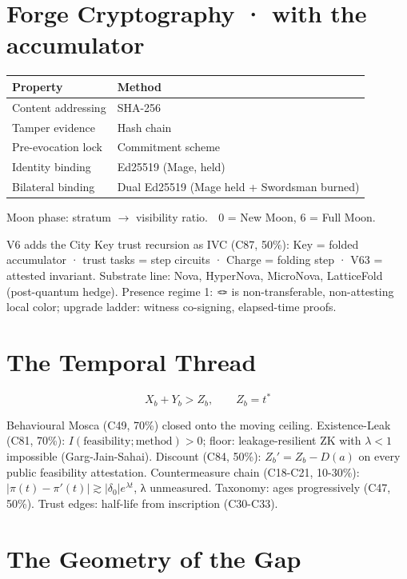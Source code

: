 \documentclass[
]{article}
\newcounter{none} %
\begin{document}
\section{Forge Cryptography · with the
accumulator}\label{forge-cryptography-with-the-accumulator}

{\def\LTcaptype{none} %
\begin{longtable}[]{@{}ll@{}}
\toprule\noalign{}
Property & Method \\
\midrule\noalign{}
\endhead
\bottomrule\noalign{}
\endlastfoot
Content addressing & SHA-256 \\
Tamper evidence & Hash chain \\
Pre-evocation lock & Commitment scheme \\
Identity binding & Ed25519 (Mage, held) \\
Bilateral binding & Dual Ed25519 (Mage held + Swordsman burned) \\
\end{longtable}
}

Moon phase: stratum \(\to\) visibility ratio. \(\;\) 0 = New Moon, 6 =
Full Moon.

V6 adds the City Key trust recursion as IVC (C87, 50\%): Key = folded
accumulator · trust tasks = step circuits · Charge = folding step · V63
= attested invariant. Substrate line: Nova, HyperNova, MicroNova,
LatticeFold (post-quantum hedge). Presence regime 1: 🪢 is
non-transferable, non-attesting local color; upgrade ladder: witness
co-signing, elapsed-time proofs.

\section{The Temporal Thread}\label{the-temporal-thread}

\[X_b + Y_b > Z_b, \qquad Z_b = t^*\]

Behavioural Mosca (C49, 70\%) closed onto the moving ceiling.
Existence-Leak (C81, 70\%):
\(I(\text{feasibility}; \text{method}) > 0\); floor: leakage-resilient
ZK with \(\lambda < 1\) impossible (Garg-Jain-Sahai). Discount (C84,
50\%): \(Z_b' = Z_b - D(a)\) on every public feasibility attestation.
Countermeasure chain (C18-C21, 10-30\%):
\(|\pi(t) - \pi'(t)| \gtrsim |\delta_0| e^{\lambda t}\), λ unmeasured.
Taxonomy: ages progressively (C47, 50\%). Trust edges: half-life from
inscription (C30-C33).

\section{The Geometry of the Gap}\label{the-geometry-of-the-gap}
\end{document}
